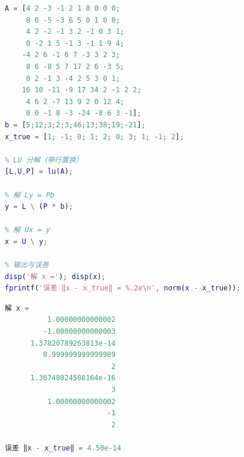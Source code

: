 \begin{lstlisting}[language=matlab]
% (3) 解10x10线性方程组 Ax = b
A = [4 2 -3 -1 2 1 0 0 0 0;
     8 6 -5 -3 6 5 0 1 0 0;
     4 2 -2 -1 3 2 -1 0 3 1;
     0 -2 1 5 -1 3 -1 1 9 4;
    -4 2 6 -1 6 7 -3 3 2 3;
     8 6 -8 5 7 17 2 6 -3 5;
     0 2 -1 3 -4 2 5 3 0 1;
    16 10 -11 -9 17 34 2 -1 2 2;
     4 6 2 -7 13 9 2 0 12 4;
     0 0 -1 8 -3 -24 -8 6 3 -1];
b = [5;12;3;2;3;46;13;38;19;-21];
x_true = [1; -1; 0; 1; 2; 0; 3; 1; -1; 2];

% LU 分解（带行置换）
[L,U,P] = lu(A);

% 解 Ly = Pb
y = L \ (P * b);

% 解 Ux = y
x = U \ y;

% 输出与误差
disp('解 x ='); disp(x);
fprintf('误差 ‖x - x_true‖ = %.2e\n', norm(x - x_true));
\end{lstlisting}
\begin{lstlisting}[language=matlab]
解 x =
          1.00000000000002
         -1.00000000000003
      1.37820789263813e-14
         0.999999999999989
                         2
      1.36748024588164e-16
                         3
          1.00000000000002
                        -1
                         2

误差 ‖x - x_true‖ = 4.50e-14
\end{lstlisting}


